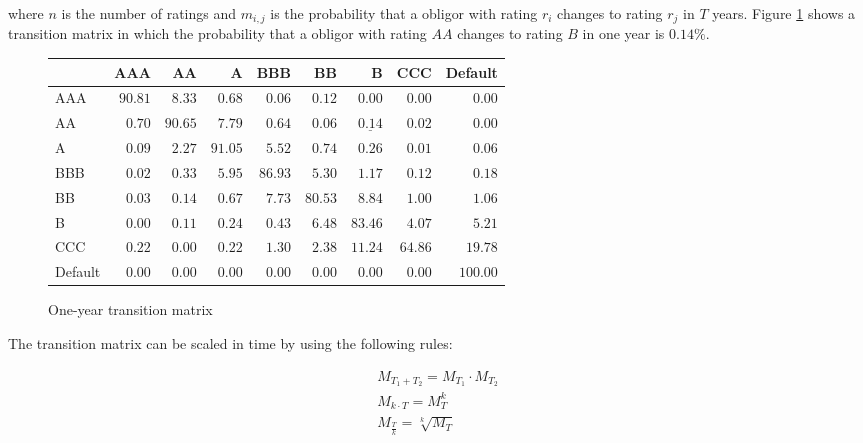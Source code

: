\documentclass[a4paper,12pt,final]{article}
\begin{document}
where $n$ is the number of ratings and $m_{i,j}$ is the probability that a
obligor with rating $r_i$ changes to rating $r_j$ in $T$ years.
Figure \ref{tmatrix1} shows a transition matrix in which the probability that 
a obligor with rating $AA$ changes to rating $B$ in one year is $0.14\%$.
\newline

\begin{figure}[!hb]
\begin{center}
\begin{tabular}[]{l|rrrrrrrr}
        &      AAA &       AA &        A &      BBB &       BB &        B &      CCC &  Default \\
\hline
AAA     &  $90.81$ &   $8.33$ &   $0.68$ &   $0.06$ &   $0.12$ &   $0.00$ &   $0.00$ &   $0.00$ \\
 AA     &   $0.70$ &  $90.65$ &   $7.79$ &   $0.64$ &   $0.06$ &   $\underline{0.14}$ &   $0.02$ &   $0.00$ \\
  A     &   $0.09$ &   $2.27$ &  $91.05$ &   $5.52$ &   $0.74$ &   $0.26$ &   $0.01$ &   $0.06$ \\
BBB     &   $0.02$ &   $0.33$ &   $5.95$ &  $86.93$ &   $5.30$ &   $1.17$ &   $0.12$ &   $0.18$ \\
 BB     &   $0.03$ &   $0.14$ &   $0.67$ &   $7.73$ &  $80.53$ &   $8.84$ &   $1.00$ &   $1.06$ \\
  B     &   $0.00$ &   $0.11$ &   $0.24$ &   $0.43$ &   $6.48$ &  $83.46$ &   $4.07$ &   $5.21$ \\
CCC     &   $0.22$ &   $0.00$ &   $0.22$ &   $1.30$ &   $2.38$ &  $11.24$ &  $64.86$ &  $19.78$ \\
Default &   $0.00$ &   $0.00$ &   $0.00$ &   $0.00$ &   $0.00$ &   $0.00$ &   $0.00$ & $100.00$ \\
\end{tabular}
\caption{One-year transition matrix}
\label{tmatrix1}
\end{center}
\end{figure}

The transition matrix can be scaled in time by using the following rules:

\begin{equation}
\label{sttm}
\begin{array}{l}
M_{T_1+T_2} = M_{T_1} \cdot M_{T_2} \nonumber \\
M_{k \cdot T} = M_{T}^k \nonumber \\
M_{\frac{T}{k}} = \sqrt[k]{M_{T}} \nonumber
\end{array}
\end{equation}
\end{document}
